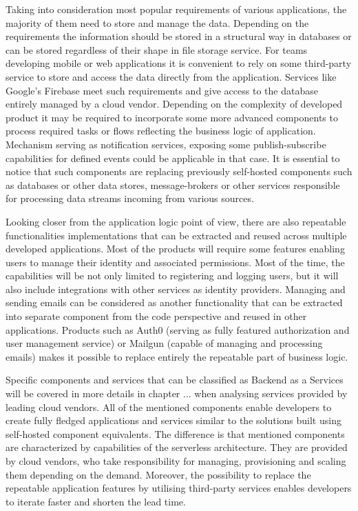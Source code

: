 Taking into consideration most popular requirements of various applications, the majority of them need to store and manage the data. Depending on the requirements the information should be stored in a structural way in databases or can be stored regardless of their shape in file storage service. For teams developing mobile or web applications it is convenient to rely on some third-party service to store and access the data directly from the application. Services like Google's Firebase meet such requirements and give access to the database entirely managed by a cloud vendor. Depending on the complexity of developed product it may be required to incorporate some more advanced components to process required tasks or flows reflecting the business logic of application. Mechanism serving as notification services, exposing some publish-subscribe capabilities for defined events could be applicable in that case. It is essential to notice that such components are replacing previously self-hosted components such as databases or other data stores, message-brokers or other services responsible for processing data streams incoming from various sources.

Looking closer from the application logic point of view, there are also repeatable functionalities implementations that can be extracted and reused across multiple developed applications. Most of the products will require some features enabling users to manage their identity and associated permissions. Most of the time, the capabilities will be not only limited to registering and logging users, but it will also include integrations with other services as identity providers. Managing and sending emails can be considered as another functionality that can be extracted into separate component from the code perspective and reused in other applications. Products such as Auth0 (serving as fully featured authorization and user management service) or Mailgun (capable of managing and processing emails) makes it possible to replace entirely the repeatable part of business logic.

Specific components and services that can be classified as Backend as a Services will be covered in more details in chapter ... when analysing services provided by leading cloud vendors. All of the mentioned components enable developers to create fully fledged applications and services similar to the solutions built using self-hosted component equivalents. The difference is that mentioned components are characterized by capabilities of the serverless architecture. They are provided by cloud vendors, who take responsibility for managing, provisioning and scaling them depending on the demand. Moreover, the possibility to replace the repeatable application features by utilising third-party services enables developers to iterate faster and shorten the lead time.

